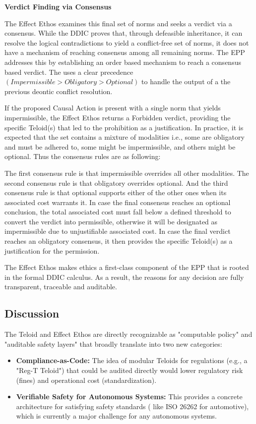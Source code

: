 \textbf{Verdict Finding via Consensus}

The Effect Ethos examines this final set of norms and seeks a verdict via a  consensus. While the DDIC proves that, through defeasible inheritance, it can resolve the logical contradictions to yield a conflict-free set of norms, it does not have a mechanism of reaching consensus among all remaining norms. The EPP addresses this by establishing an order based  mechanism to reach a consensus based verdict. The uses a clear precedence $(Impermissible > Obligatory > Optional)$ to handle the output of a the previous deontic conflict resolution. 

If the proposed Causal Action is present with a single norm that yields impermissible, the Effect Ethos returns a Forbidden verdict, providing the specific Teloid(s) that led to the prohibition as a justification. In practice, it is expected that the set contains a mixture of modalities i.e., some are obligatory and must be adhered to, some might be impermissible, and others might be optional. Thus the consensus rules are as following:

The first consensus rule is that impermissible overrides all other modalities. 
The second  consensus rule is that  obligatory overrides optional. 
And the third consensus rule is that optional supports either of the other ones when its associated cost warrants it. In case the final consensus reaches an optional conclusion, the total  associated cost must fall below a defined threshold to convert the verdict into permissible, otherwise it will be designated as impermissible due to unjustifiable associated cost. In case the final verdict reaches an obligatory consensus, it then provides the specific Teloid(s) as a justification for the permission.

The Effect Ethos makes ethics a first-class component of the EPP that is rooted in the formal DDIC calculus. As a result, the reasons for any decision are fully transparent, traceable and auditable. 
\newpage

\subsection{Discussion}

The Teloid and Effect Ethos are directly recognizable as "computable policy" and "auditable safety
layers" that broadly translate into two new categories:

\begin{itemize}
  \item \textbf{Compliance-as-Code:} The idea of modular Teloids for regulations (e.g., a "Reg-T Teloid") that could be audited
  directly would lower regulatory risk (fines) and operational cost (standardization).
  \item \textbf{Verifiable Safety for Autonomous Systems:} This provides a concrete architecture for satisfying safety standards (
  like ISO 26262 for automotive), which is currently a major challenge for any autonomous systems.
\end{itemize}


